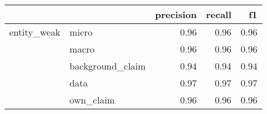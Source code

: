 \begin{tabular}{llrrr}
\toprule
            &           &  precision &  recall &   f1 \\
\midrule
entity\_weak & micro &       0.96 &    0.96 & 0.96 \\
            & macro &       0.96 &    0.96 & 0.96 \\
            & background\_claim &       0.94 &    0.94 & 0.94 \\
            & data &       0.97 &    0.97 & 0.97 \\
            & own\_claim &       0.96 &    0.96 & 0.96 \\
\bottomrule
\end{tabular}
